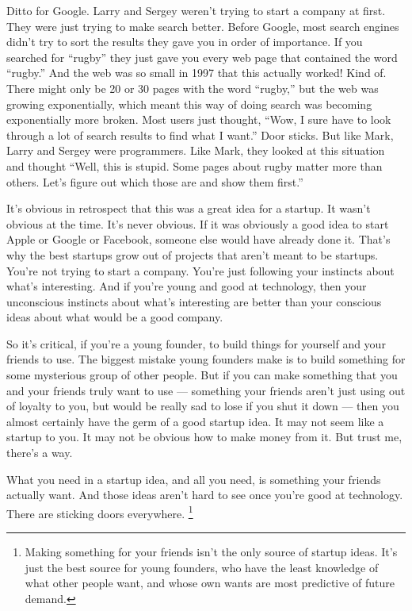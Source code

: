 \documentclass[12pt]{book}
\begin{document}
Ditto for Google. Larry and Sergey weren't trying to start a company at
first. They were just trying to make search better. Before Google, most
search engines didn't try to sort the results they gave you in order of
importance. If you searched for ``rugby'' they just gave you every web
page that contained the word ``rugby.'' And the web was so small in 1997
that this actually worked! Kind of. There might only be 20 or 30 pages
with the word ``rugby,'' but the web was growing exponentially, which
meant this way of doing search was becoming exponentially more broken.
Most users just thought, ``Wow, I sure have to look through a lot of
search results to find what I want.'' Door sticks. But like Mark, Larry
and Sergey were programmers. Like Mark, they looked at this situation
and thought ``Well, this is stupid. Some pages about rugby matter more
than others. Let's figure out which those are and show them first.''

It's obvious in retrospect that this was a great idea for a startup. It
wasn't obvious at the time. It's never obvious. If it was obviously a
good idea to start Apple or Google or Facebook, someone else would have
already done it. That's why the best startups grow out of projects that
aren't meant to be startups. You're not trying to start a company.
You're just following your instincts about what's interesting. And if
you're young and good at technology, then your unconscious instincts
about what's interesting are better than your conscious ideas about what
would be a good company.

So it's critical, if you're a young founder, to build things for
yourself and your friends to use. The biggest mistake young founders
make is to build something for some mysterious group of other people.
But if you can make something that you and your friends truly want to
use --- something your friends aren't just using out of loyalty to you,
but would be really sad to lose if you shut it down --- then you almost
certainly have the germ of a good startup idea. It may not seem like a
startup to you. It may not be obvious how to make money from it. But
trust me, there's a way.

What you need in a startup idea, and all you need, is something your
friends actually want. And those ideas aren't hard to see once you're
good at technology. There are sticking doors everywhere.
\footnote{Making something for your friends isn't the only source of
startup ideas. It's just the best source for young founders, who have
the least knowledge of what other people want, and whose own wants are
most predictive of future demand.}
\end{document}
